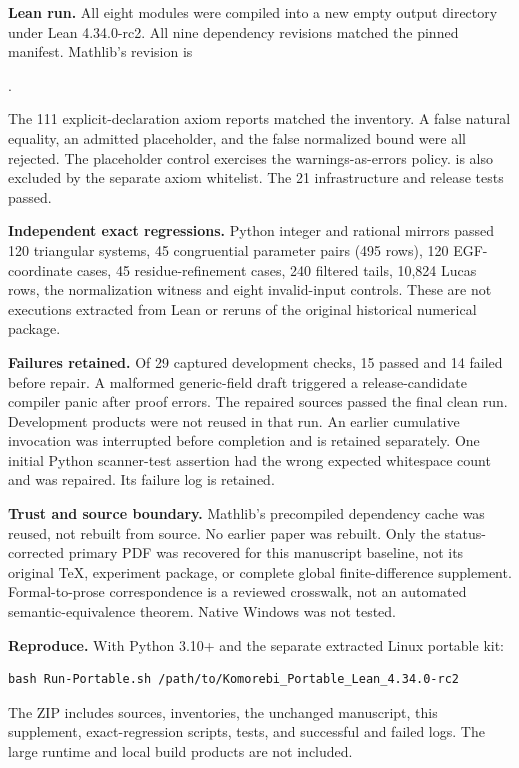 \textbf{Lean run.} All eight modules were compiled into a new empty output directory under Lean 4.34.0-rc2. All nine dependency revisions matched the pinned manifest. Mathlib's revision is\par
{\footnotesize{}.}

The 111 explicit-declaration axiom reports matched the inventory. A false natural equality, an admitted placeholder, and the false normalized bound were all rejected. The placeholder control exercises the warnings-as-errors policy.  is also excluded by the separate axiom whitelist. The 21 infrastructure and release tests passed.

\textbf{Independent exact regressions.} Python integer and rational mirrors passed 120 triangular systems, 45 congruential parameter pairs (495 rows), 120 EGF-coordinate cases, 45 residue-refinement cases, 240 filtered tails, 10,824 Lucas rows, the normalization witness and eight invalid-input controls. These are not executions extracted from Lean or reruns of the original historical numerical package.

\textbf{Failures retained.} Of 29 captured development checks, 15 passed and 14 failed before repair. A malformed generic-field draft triggered a release-candidate compiler panic after proof errors. The repaired sources passed the final clean run. Development products were not reused in that run. An earlier cumulative invocation was interrupted before completion and is retained separately. One initial Python scanner-test assertion had the wrong expected whitespace count and was repaired. Its failure log is retained.

\textbf{Trust and source boundary.} Mathlib's precompiled dependency cache was reused, not rebuilt from source. No earlier paper was rebuilt. Only the status-corrected primary PDF was recovered for this manuscript baseline, not its original TeX, experiment package, or complete global finite-difference supplement. Formal-to-prose correspondence is a reviewed crosswalk, not an automated semantic-equivalence theorem. Native Windows was not tested.

\textbf{Reproduce.} With Python 3.10+ and the separate extracted Linux portable kit:
\begin{verbatim}
bash Run-Portable.sh /path/to/Komorebi_Portable_Lean_4.34.0-rc2
\end{verbatim}
The ZIP includes sources, inventories, the unchanged manuscript, this supplement, exact-regression scripts, tests, and successful and failed logs. The large runtime and local build products are not included.
